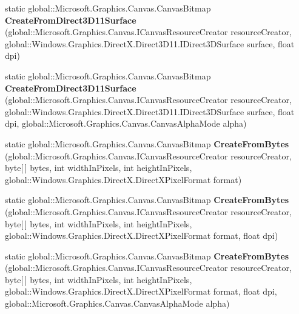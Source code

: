 \begin{DoxyCompactItemize}
static global\+::\+Microsoft.\+Graphics.\+Canvas.\+Canvas\+Bitmap {\bfseries Create\+From\+Direct3\+D11\+Surface} (global\+::\+Microsoft.\+Graphics.\+Canvas.\+I\+Canvas\+Resource\+Creator resource\+Creator, global\+::\+Windows.\+Graphics.\+Direct\+X.\+Direct3\+D11.\+I\+Direct3\+D\+Surface surface, float dpi)
\item 
\mbox{\label{class_microsoft_1_1_graphics_1_1_canvas_1_1_canvas_bitmap_af8889f744c558157dc904b1fd37e99a4}} 
static global\+::\+Microsoft.\+Graphics.\+Canvas.\+Canvas\+Bitmap {\bfseries Create\+From\+Direct3\+D11\+Surface} (global\+::\+Microsoft.\+Graphics.\+Canvas.\+I\+Canvas\+Resource\+Creator resource\+Creator, global\+::\+Windows.\+Graphics.\+Direct\+X.\+Direct3\+D11.\+I\+Direct3\+D\+Surface surface, float dpi, global\+::\+Microsoft.\+Graphics.\+Canvas.\+Canvas\+Alpha\+Mode alpha)
\item 
\mbox{\label{class_microsoft_1_1_graphics_1_1_canvas_1_1_canvas_bitmap_a0348f1385bf9b0fc99f3bd0a55c0ae0a}} 
static global\+::\+Microsoft.\+Graphics.\+Canvas.\+Canvas\+Bitmap {\bfseries Create\+From\+Bytes} (global\+::\+Microsoft.\+Graphics.\+Canvas.\+I\+Canvas\+Resource\+Creator resource\+Creator, byte\mbox{[}$\,$\mbox{]} bytes, int width\+In\+Pixels, int height\+In\+Pixels, global\+::\+Windows.\+Graphics.\+Direct\+X.\+Direct\+X\+Pixel\+Format format)
\item 
\mbox{\label{class_microsoft_1_1_graphics_1_1_canvas_1_1_canvas_bitmap_a34eb9feffadf35700e66c251dd67d5fc}} 
static global\+::\+Microsoft.\+Graphics.\+Canvas.\+Canvas\+Bitmap {\bfseries Create\+From\+Bytes} (global\+::\+Microsoft.\+Graphics.\+Canvas.\+I\+Canvas\+Resource\+Creator resource\+Creator, byte\mbox{[}$\,$\mbox{]} bytes, int width\+In\+Pixels, int height\+In\+Pixels, global\+::\+Windows.\+Graphics.\+Direct\+X.\+Direct\+X\+Pixel\+Format format, float dpi)
\item 
\mbox{\label{class_microsoft_1_1_graphics_1_1_canvas_1_1_canvas_bitmap_a9681e1d684ee6e674d7512d2874c8f1b}} 
static global\+::\+Microsoft.\+Graphics.\+Canvas.\+Canvas\+Bitmap {\bfseries Create\+From\+Bytes} (global\+::\+Microsoft.\+Graphics.\+Canvas.\+I\+Canvas\+Resource\+Creator resource\+Creator, byte\mbox{[}$\,$\mbox{]} bytes, int width\+In\+Pixels, int height\+In\+Pixels, global\+::\+Windows.\+Graphics.\+Direct\+X.\+Direct\+X\+Pixel\+Format format, float dpi, global\+::\+Microsoft.\+Graphics.\+Canvas.\+Canvas\+Alpha\+Mode alpha)

\end{DoxyCompactItemize}
